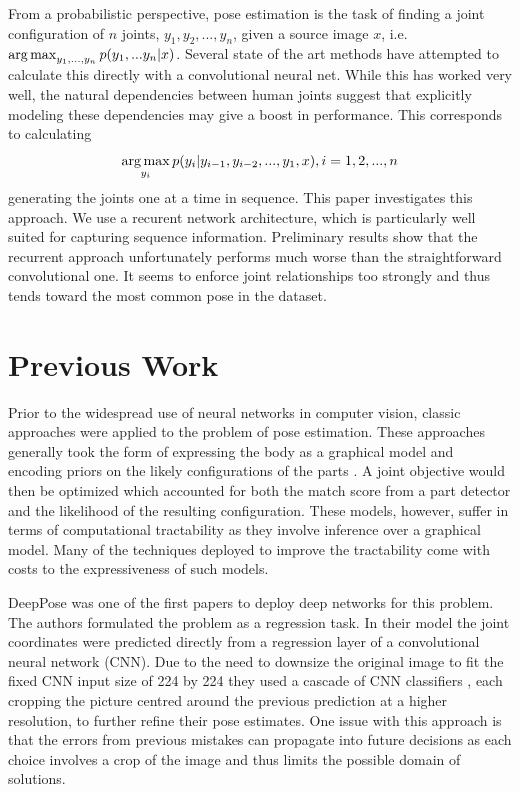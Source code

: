 \documentclass[11pt,twocolumn,letterpaper]{article}
\begin{document}
From a probabilistic perspective, pose estimation is the task of finding
a joint configuration of $n$ joints, $y_1, y_2,..., y_n$, given a source image $x$, i.e.
$\argmax_{y_1,...,y_n} p(y_1,...y_n|x)$. Several state of the art methods
have attempted to calculate this directly with a convolutional neural net. While
this has worked very well, the natural dependencies between human joints suggest
that explicitly modeling these dependencies may give a boost in performance.
This corresponds to calculating 
$$\argmax_{y_i} p(y_i | y_{i-1}, y_{i-2},...,y_1, x), i = 1, 2,...,n$$\textemdash generating 
the joints one at a time in sequence. 
This paper investigates this approach. We
use a recurent network architecture, which is particularly well suited for
capturing sequence information. Preliminary results show that the recurrent
approach unfortunately performs much worse than the straightforward convolutional one. It
seems to enforce joint relationships too strongly and thus tends toward the most common
pose in the dataset.

\section{Previous Work}

Prior to the widespread use of neural networks in computer vision, classic approaches were applied to the problem of pose estimation. These approaches generally took the form of expressing the body as a graphical model and encoding priors on the likely configurations of the parts \cite{felzenszwalb2005pictorial}. A joint objective would then be optimized which accounted for both the match score from a part detector and the likelihood of the resulting configuration. These models, however, suffer in terms of computational tractability as they involve inference over a graphical model. Many of the techniques deployed to improve the tractability come with costs to the expressiveness of such models\cite{yang2011articulated}.

DeepPose was one of the first papers to deploy deep networks for this problem. The authors formulated the problem as a regression task. In their model the 
joint coordinates were predicted directly from a regression layer of a convolutional neural network (CNN). Due to the need to downsize the original image to fit the fixed CNN input size of 224 by 224 they used a cascade of CNN classifiers \cite{toshev2014deeppose}, each cropping the picture centred around the previous prediction at a higher resolution, to further refine their pose estimates. One issue with this approach is that the errors from previous mistakes can propagate into future decisions as each choice involves a crop of the image and thus limits the possible domain of solutions.
\end{document}
